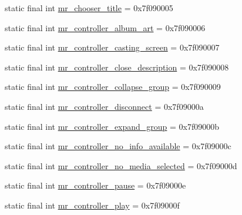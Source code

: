 \begin{CompactItemize}
\item 
static final int \hyperlink{classandroid_1_1support_1_1graphics_1_1drawable_1_1animated_1_1_r_1_1string_a439c83baa38605655aaf138c3528a6d}{mr\_\-chooser\_\-title} = 0x7f090005
\item 
static final int \hyperlink{classandroid_1_1support_1_1graphics_1_1drawable_1_1animated_1_1_r_1_1string_f7ed1946b17b767e180011f17906b9d3}{mr\_\-controller\_\-album\_\-art} = 0x7f090006
\item 
static final int \hyperlink{classandroid_1_1support_1_1graphics_1_1drawable_1_1animated_1_1_r_1_1string_b766bc5fc44cd21ff46987e30fca04c2}{mr\_\-controller\_\-casting\_\-screen} = 0x7f090007
\item 
static final int \hyperlink{classandroid_1_1support_1_1graphics_1_1drawable_1_1animated_1_1_r_1_1string_693c39c1370aac310dff7b8dfc0a45d4}{mr\_\-controller\_\-close\_\-description} = 0x7f090008
\item 
static final int \hyperlink{classandroid_1_1support_1_1graphics_1_1drawable_1_1animated_1_1_r_1_1string_210bd6b2320d0cfb2994d6aa239ede92}{mr\_\-controller\_\-collapse\_\-group} = 0x7f090009
\item 
static final int \hyperlink{classandroid_1_1support_1_1graphics_1_1drawable_1_1animated_1_1_r_1_1string_8b0acfea1ea86585f3d870bf127babfa}{mr\_\-controller\_\-disconnect} = 0x7f09000a
\item 
static final int \hyperlink{classandroid_1_1support_1_1graphics_1_1drawable_1_1animated_1_1_r_1_1string_4a7a54eb6a167881da3f0c665fe377f3}{mr\_\-controller\_\-expand\_\-group} = 0x7f09000b
\item 
static final int \hyperlink{classandroid_1_1support_1_1graphics_1_1drawable_1_1animated_1_1_r_1_1string_469c3add81c7d4ab966e39520c0f02ce}{mr\_\-controller\_\-no\_\-info\_\-available} = 0x7f09000c
\item 
static final int \hyperlink{classandroid_1_1support_1_1graphics_1_1drawable_1_1animated_1_1_r_1_1string_173dc788f53ad34f4ddef242cc20b716}{mr\_\-controller\_\-no\_\-media\_\-selected} = 0x7f09000d
\item 
static final int \hyperlink{classandroid_1_1support_1_1graphics_1_1drawable_1_1animated_1_1_r_1_1string_8a34f6a6cfb5d9d2de4dc88e36f7fdf4}{mr\_\-controller\_\-pause} = 0x7f09000e
\item 
static final int \hyperlink{classandroid_1_1support_1_1graphics_1_1drawable_1_1animated_1_1_r_1_1string_2a0c9be11a98322e4e140c9de5199ac8}{mr\_\-controller\_\-play} = 0x7f09000f
\item 

\end{CompactItemize}
